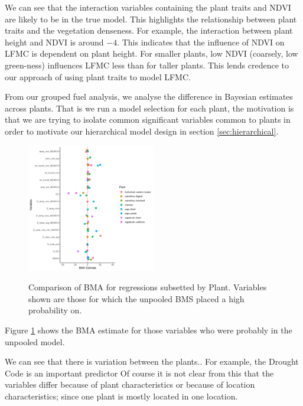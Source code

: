 \documentclass[twocolumn,10pt]{article}
\begin{document}
We can see that the interaction variables containing the plant traits and NDVI are likely to be in the true model.
This highlights the relationship between plant traits and the vegetation denseness.
For example, the interaction between plant height and NDVI is around $-4$. This indicates that the influence of NDVI on LFMC is dependent on plant height. For smaller plants, low NDVI (coarsely, low green-ness) influences LFMC less than for taller plants.
This lends credence to our approach of using plant traits to model LFMC. 

From our grouped fuel analysis, we analyse the difference in Bayesian estimates across plants.
That is we run a model selection for each plant,
the motivation is that we are trying to isolate common significant variables common to plants
in order to motivate our hierarchical model design in section \ref{sec:hierarchical}.

\begin{figure}[htpb]
    \centering
    {\includegraphics[width=0.5\textwidth, scale=0.5]{./figures/bms/comparison_plot_old.png}}
    \caption{Comparison of BMA for regressions subsetted by Plant.
             Variables shown are those for which the unpooled BMS placed a high probability on.}
    \label{fig:comparison}
\end{figure}

Figure \ref{fig:comparison} shows the BMA estimate for those variables who were probably in the unpooled model.

We can see that there is variation between the plants..
For example, the Drought Code is an important predictor 
Of course it is not clear from this that the variables differ
because of plant characteristics or because of location characteristics; since one plant is mostly located in one location. %
\end{document}
